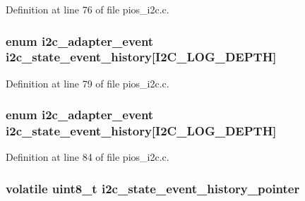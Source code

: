 \-Definition at line 76 of file pios\-\_\-i2c.\-c.

\hypertarget{group___p_i_o_s___i2_c_gad2fddef6926d27512901cbe84b7b99bd}{
\subsubsection[{i2c\-\_\-state\-\_\-event\-\_\-history}]{\setlength{\rightskip}{0pt plus 5cm}enum {\bf i2c\-\_\-adapter\-\_\-event} {\bf i2c\-\_\-state\-\_\-event\-\_\-history}\mbox{[}\-I2\-C\-\_\-\-L\-O\-G\-\_\-\-D\-E\-P\-T\-H\mbox{]}}}\label{group___p_i_o_s___i2_c_gad2fddef6926d27512901cbe84b7b99bd}


\-Definition at line 79 of file pios\-\_\-i2c.\-c.

\hypertarget{group___p_i_o_s___i2_c_gad2fddef6926d27512901cbe84b7b99bd}{
\subsubsection[{i2c\-\_\-state\-\_\-event\-\_\-history}]{\setlength{\rightskip}{0pt plus 5cm}enum {\bf i2c\-\_\-adapter\-\_\-event} {\bf i2c\-\_\-state\-\_\-event\-\_\-history}\mbox{[}\-I2\-C\-\_\-\-L\-O\-G\-\_\-\-D\-E\-P\-T\-H\mbox{]}}}\label{group___p_i_o_s___i2_c_gad2fddef6926d27512901cbe84b7b99bd}


\-Definition at line 84 of file pios\-\_\-i2c.\-c.

\hypertarget{group___p_i_o_s___i2_c_gabdb9d9357371d1ece20779da0d69d27b}{
\subsubsection[{i2c\-\_\-state\-\_\-event\-\_\-history\-\_\-pointer}]{\setlength{\rightskip}{0pt plus 5cm}volatile uint8\-\_\-t {\bf i2c\-\_\-state\-\_\-event\-\_\-history\-\_\-pointer}}}\label{group___p_i_o_s___i2_c_gabdb9d9357371d1ece20779da0d69d27b}


